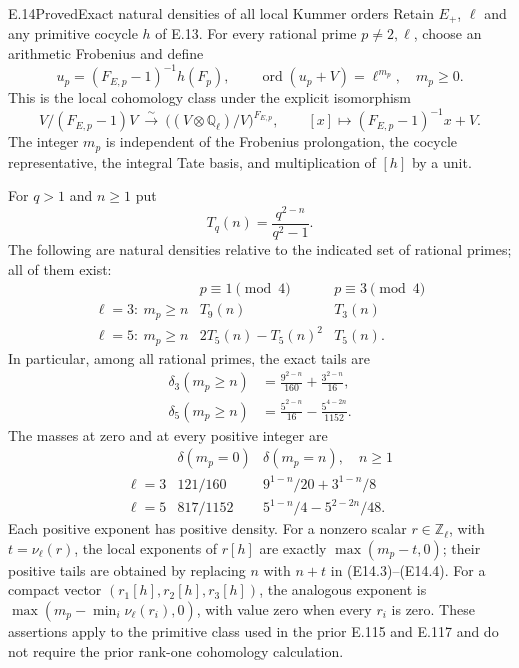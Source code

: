 \begin{statement}{E.14}{Proved}{Exact natural densities of all local Kummer orders}
Retain $E_+$, $\ell$ and any primitive cocycle $h$ of E.13.
For every rational prime $p\ne2,\ell$, choose an arithmetic
Frobenius and define
\[
 u_p=(F_{E,p}-1)^{-1}h(F_p),\qquad
 \operatorname{ord}(u_p+V)=\ell^{m_p},\quad m_p\ge0.
 \tag{E14.1}
\]
This is the local cohomology class under the explicit isomorphism
\[
 V/(F_{E,p}-1)V\ \xrightarrow{\sim}\
 \bigl((V\otimes\mathbb Q_\ell)/V\bigr)^{F_{E,p}},
 \qquad [x]\longmapsto(F_{E,p}-1)^{-1}x+V.
 \tag{E14.2}
\]
The integer $m_p$ is independent of the Frobenius prolongation,
the cocycle representative, the integral Tate basis, and
multiplication of $[h]$ by a unit.

For $q>1$ and $n\ge1$ put
\[
             T_q(n)=\frac{q^{2-n}}{q^2-1}.
\]
The following are natural densities relative to the indicated
set of rational primes; all of them exist:
\[
\begin{array}{c|cc}
 &p\equiv1\pmod4&p\equiv3\pmod4\\\hline
 \ell=3:\ m_p\ge n&T_9(n)&T_3(n)\\
 \ell=5:\ m_p\ge n&2T_5(n)-T_5(n)^2&T_5(n).
\end{array}
 \tag{E14.3}
\]
In particular, among all rational primes, the exact tails are
\[
\begin{split}
 \delta_3(m_p\ge n)&=\frac{9^{2-n}}{160}
                         +\frac{3^{2-n}}{16},\\
 \delta_5(m_p\ge n)&=\frac{5^{2-n}}{16}
                         -\frac{5^{4-2n}}{1152}.
\end{split}
 \tag{E14.4}
\]
The masses at zero and at every positive integer are
\[
\begin{array}{c|cc}
 &\delta(m_p=0)&\delta(m_p=n),\quad n\ge1\\\hline
 \ell=3&121/160&9^{1-n}/20+3^{1-n}/8\\
 \ell=5&817/1152&5^{1-n}/4-5^{2-2n}/48.
\end{array}
 \tag{E14.5}
\]
Each positive exponent has positive density.  For a nonzero scalar
$r\in\mathbb Z_\ell$, with $t=\nu_\ell(r)$, the local exponents
of $r[h]$ are exactly $\max(m_p-t,0)$; their positive tails are
obtained by replacing $n$ with $n+t$ in (E14.3)--(E14.4).
For a compact vector $(r_1[h],r_2[h],r_3[h])$, the analogous
exponent is $\max(m_p-\min_i\nu_\ell(r_i),0)$, with value zero
when every $r_i$ is zero.  These assertions apply to the primitive
class used in the prior E.115 and E.117 and do not require the
prior rank-one cohomology calculation.
\end{statement}
